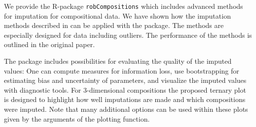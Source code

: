 \documentclass{scrartcl}\usepackage[]{graphicx}\usepackage[]{color}
\begin{document}
We provide the R-package {\tt robCompositions} which includes advanced methods for 
imputation for compositional data. We have shown how the imputation
methods described in \cite{Hron09} can be applied with the package.
The methods are especially designed for data including outliers.
The performance of the methods is outlined in the original paper.

The package includes possibilities for evaluating the quality of
the imputed values: One can compute measures for information loss,
use bootstrapping for estimating bias and uncertainty of parameters,
and visualize the imputed values with diagnostic tools.
For 3-dimensional compositions the proposed ternary plot is designed 
to highlight how well imputations are made and which compositions were imputed.
Note that many additional options
can be used within these plots given by the arguments of the 
plotting function.

{}

\end{document}
